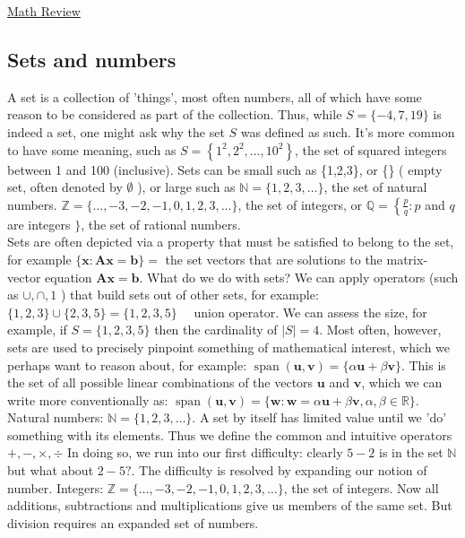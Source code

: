 \documentclass[main.tex]{subfiles}
\begin{document}
\href{https://www2.seas.gwu.edu/~simhaweb/quantum/modules/review/math-review/math-review.html}{Math Review}

\subsection{Sets and numbers}

A set is a collection of 'things', most often numbers, all of which have some reason to be considered as part of the collection. Thus, while $S=\{-4,7,19\}$ is indeed a set, one might ask why the set $S$ was defined as such. It's more common to have some meaning, such as $S=\left\{1^{2}, 2^{2}, \ldots, 10^{2}\right\}$, the set of squared integers between 1 and 100 (inclusive). Sets can be small such as \{1,2,3\}, or \{\} ( empty set, often denoted by  $\emptyset$ ), or large such as $\mathbb{N}=\{1,2,3, \ldots\}$, the set of natural numbers. $\mathbb{Z}=\{\ldots,-3,-2,-1,0,1,2,3, \ldots\}$, the set of integers, or $\mathbb{Q}=\left\{\frac{p}{q}: p\right.$ and $q$ are integers $\}$, the set of rational numbers.\\

Sets are often depicted via a property that must be satisfied to belong to the set, for example $\{\mathbf{x}: \mathbf{A x}=\mathbf{b}\}=$ the set vectors that are solutions to the matrix-vector equation $\mathbf{A x}=\mathbf{b}$. What do we do with sets? We can apply operators (such as $\cup, \cap, 1$ ) that build sets out of other sets, for example: $\{1,2,3\} \cup\{2,3,5\}=\{1,2,3,5\} \quad$ union operator. We can assess the size, for example, if $S=\{1,2,3,5\}$ then the cardinality of $|S|=4$. Most often, however, sets are used to precisely pinpoint something of mathematical interest, which we perhaps want to reason about, for example: $\operatorname{span}(\mathbf{u}, \mathbf{v})=\{\alpha \mathbf{u}+\beta \mathbf{v}\}$. This is the set of all possible linear combinations of the vectors $\mathbf{u}$ and $\mathbf{v}$, which we can write more conventionally as: $\operatorname{span}(\mathbf{u}, \mathbf{v})=\{\mathbf{w}: \mathbf{w}=\alpha \mathbf{u}+\beta \mathbf{v}, \alpha, \beta \in \mathbb{R}\}$.\\

Natural numbers: $\mathbb{N}=\{1,2,3, \ldots\}$. A set by itself has limited value until we 'do' something with its elements. Thus we define the common and intuitive operators $+,-, \times, \div$ In doing so, we run into our first difficulty: clearly $5-2$ is in the set $\mathbb{N}$ but what about $2-5 ?$. The difficulty is resolved by expanding our notion of number. Integers: $\mathbb{Z}=\{\ldots,-3,-2,-1,0,1,2,3, \ldots\}$, the set of integers. Now all additions, subtractions and multiplications give us members of the same set. But division requires an expanded set of numbers.\\
\end{document}

